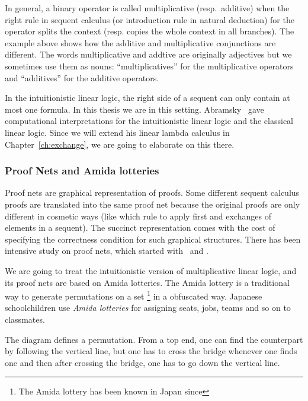  In general, a binary operator is called multiplicative (resp.~additive)
 when the right rule in sequent calculus (or introduction rule in
 natural deduction) for the operator splits the context (resp. copies
 the whole context in all branches). 
 The example above shows how the additive and multiplicative
 conjunctions are different.
 The words multiplicative and addtive are originally adjectives but
 we sometimes use them as nouns: ``multiplicatives'' for the
 multiplicative operators and ``additives'' for the additive operators.


 In the intuitionistic linear logic, the right side of a sequent can only
 contain at most one formula.  In this thesis we are in this
 setting.
 Abramsky~\citep{abramsky1993computational} gave computational
 interpretations for the intuitionistic linear logic and the classical
 linear logic.  Since we will extend his linear lambda calculus in
 Chapter~\ref{ch:exchange}, we are going to elaborate on this there.

 \subsubsection{Proof Nets and Amida lotteries}

Proof nets are graphical representation of proofs.
Some different sequent calculus proofs are translated into the same
proof net because the original proofs are only different in cosmetic
ways (like which rule to apply first and exchanges of elements in a
sequent).
The succinct representation comes with the cost of specifying
the correctness condition for such graphical structures.
There has been intensive study on proof nets,
which started with~\citet{girard1987} and \citet{danos-regnier}.

 We are going to treat the intuitionistic version of
 multiplicative linear logic, and its proof nets are based on Amida
 lotteries.
 The Amida lottery is a traditional way to generate permutations on a set%
 \footnote{The Amida lottery has been known in Japan since } in a
 obfuscated way.
Japanese schoolchildren use \textit{Amida lotteries}
for assigning seats, jobs, teams and so on to classmates.


The diagram defines a permutation.
From a top end, one can find the counterpart by following the vertical
line, but one has to cross the bridge whenever one finds one and then
after crossing the bridge, one has to go down the vertical line.



